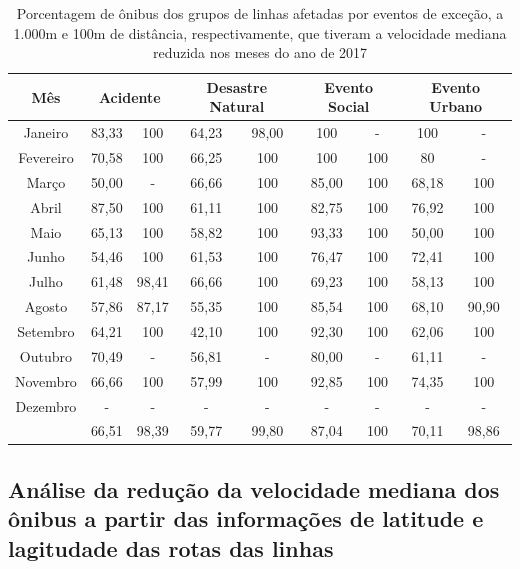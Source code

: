 \documentclass[
	12pt,				%
	oneside,			%
	a4paper,			%
	english,			%
	brazil				%
	]{abntex2ppgsi}
\begin{document}
{{\begin{table}[!htb]
\centering
\caption {Porcentagem de ônibus dos grupos de linhas afetadas por eventos de exceção, a 1.000m e 100m de distância, respectivamente, que tiveram a velocidade mediana reduzida nos meses do ano de 2017}
\label{tab:exceptEventVelocityImpAllStop}
\begin{tabular}{c|cc|cc|cc|cc}
\toprule
\textbf{Mês} & \multicolumn{2}{c}{\textbf{Acidente}} & \multicolumn{2}{c}{\textbf{Desastre Natural}} & \multicolumn{2}{c}{\textbf{Evento Social}} &
\multicolumn{2}{c}{\textbf{Evento Urbano}}\\
\midrule
Janeiro & 83,33 &  100 & 
64,23 &  98,00 & 
100 & - &
 100 & - \\
\hline
Fevereiro & 70,58 &  100 &
 66,25 &  100 &
 100 & 100 &
 80 & - \\
\hline
Março &  50,00 &  - & 
66,66 &  100 &
85,00 & 100 &
68,18 & 100 \\
\hline
Abril & 87,50 &100 & 
 61,11 & 100 & 
 82,75 & 100 & 
 76,92 &  100 \\
\hline
Maio & 65,13 &  100 &
 58,82 &  100 &
 93,33 & 100 &
 50,00 & 100 \\
\hline
Junho & 54,46 &  100 &
 61,53 &  100 &
 76,47 & 100 &
 72,41 & 100 \\
\hline
Julho & 61,48 &  98,41 &
 66,66 & 100 &
 69,23 & 100 &
58,13 & 100 \\
\hline
Agosto & 57,86 & 87,17 &
 55,35 & 100 &
 85,54 & 100 & 
 68,10 & 90,90 \\
\hline
Setembro & 64,21 & 100 &
 42,10 & 100 &
 92,30 & 100 & 
 62,06 & 100 \\
\hline
Outubro & 70,49 & - &
 56,81 & - &
 80,00 & - &
 61,11 & - \\
\hline
Novembro & 66,66 & 100 &
 57,99 & 100 &
 92,85 & 100 &
 74,35 & 100 \\
\hline
Dezembro & - & - & - & - & - & - & - & -  \\
\midrule
{} & 66,51 & 98,39 & 59,77 & 99,80 & 87,04 & 100 & 70,11 & 98,86  \\
\bottomrule
\end{tabular}
\end{table}

\subsection*{Análise da redução da velocidade mediana dos ônibus a partir das informações de latitude e lagitudade das rotas das linhas}

}}
\end{document}
